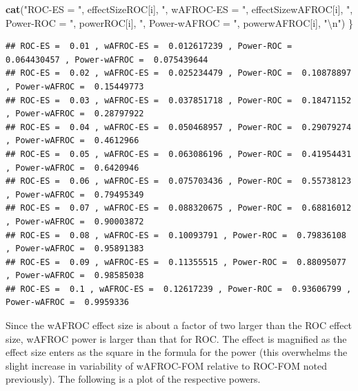 \documentclass[
]{book}
\newenvironment{Shaded}{\begin{snugshade}}{\end{snugshade}}
\newcommand{\CharTok}[1]{\textcolor[rgb]{0.31,0.60,0.02}{#1}}
\newcommand{\KeywordTok}[1]{\textcolor[rgb]{0.13,0.29,0.53}{\textbf{#1}}}
\newcommand{\NormalTok}[1]{#1}
\newcommand{\StringTok}[1]{\textcolor[rgb]{0.31,0.60,0.02}{#1}}
\begin{document}
\begin{Shaded}
\begin{Highlighting}[]
  \KeywordTok{cat}\NormalTok{(}\StringTok{"ROC-ES = "}\NormalTok{, effectSizeROC[i], }\StringTok{", wAFROC-ES = "}\NormalTok{, effectSizewAFROC[i], }
      \StringTok{", Power-ROC = "}\NormalTok{, powerROC[i], }\StringTok{", Power-wAFROC = "}\NormalTok{, powerwAFROC[i], }\StringTok{"}\CharTok{\textbackslash{}n}\StringTok{"}\NormalTok{)}
\NormalTok{\}}
\end{Highlighting}
\end{Shaded}

\begin{verbatim}
## ROC-ES =  0.01 , wAFROC-ES =  0.012617239 , Power-ROC =  0.064430457 , Power-wAFROC =  0.075439644 
## ROC-ES =  0.02 , wAFROC-ES =  0.025234479 , Power-ROC =  0.10878897 , Power-wAFROC =  0.15449773 
## ROC-ES =  0.03 , wAFROC-ES =  0.037851718 , Power-ROC =  0.18471152 , Power-wAFROC =  0.28797922 
## ROC-ES =  0.04 , wAFROC-ES =  0.050468957 , Power-ROC =  0.29079274 , Power-wAFROC =  0.4612966 
## ROC-ES =  0.05 , wAFROC-ES =  0.063086196 , Power-ROC =  0.41954431 , Power-wAFROC =  0.6420946 
## ROC-ES =  0.06 , wAFROC-ES =  0.075703436 , Power-ROC =  0.55738123 , Power-wAFROC =  0.79495349 
## ROC-ES =  0.07 , wAFROC-ES =  0.088320675 , Power-ROC =  0.68816012 , Power-wAFROC =  0.90003872 
## ROC-ES =  0.08 , wAFROC-ES =  0.10093791 , Power-ROC =  0.79836108 , Power-wAFROC =  0.95891383 
## ROC-ES =  0.09 , wAFROC-ES =  0.11355515 , Power-ROC =  0.88095077 , Power-wAFROC =  0.98585038 
## ROC-ES =  0.1 , wAFROC-ES =  0.12617239 , Power-ROC =  0.93606799 , Power-wAFROC =  0.9959336
\end{verbatim}

Since the wAFROC effect size is about a factor of two larger than the ROC effect size, wAFROC power is larger than that for ROC. The effect is magnified as the effect size enters as the square in the formula for the power (this overwhelms the slight increase in variability of wAFROC-FOM relative to ROC-FOM noted previously). The following is a plot of the respective powers.
\end{document}
